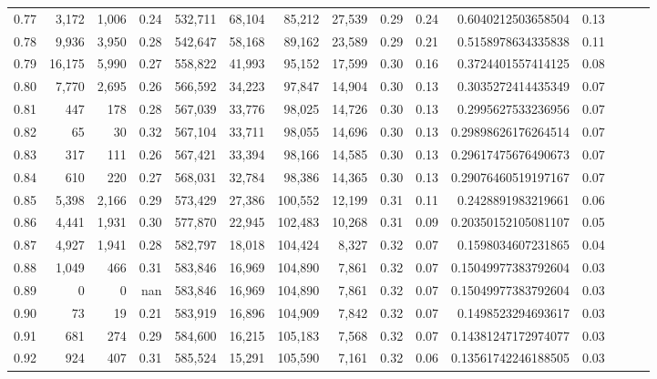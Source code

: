 \begin{tabular}{rrrrrrrrrrrrrrr}
0.77 &   3,172 &  1,006 &  0.24 &  532,711 &   68,104 &   85,212 &   27,539 &  0.29 &  0.24 &   0.6040212503658504 &      0.13 \\
0.78 &   9,936 &  3,950 &  0.28 &  542,647 &   58,168 &   89,162 &   23,589 &  0.29 &  0.21 &   0.5158978634335838 &      0.11 \\
0.79 &  16,175 &  5,990 &  0.27 &  558,822 &   41,993 &   95,152 &   17,599 &  0.30 &  0.16 &   0.3724401557414125 &      0.08 \\
0.80 &   7,770 &  2,695 &  0.26 &  566,592 &   34,223 &   97,847 &   14,904 &  0.30 &  0.13 &   0.3035272414435349 &      0.07 \\
0.81 &     447 &    178 &  0.28 &  567,039 &   33,776 &   98,025 &   14,726 &  0.30 &  0.13 &   0.2995627533236956 &      0.07 \\
0.82 &      65 &     30 &  0.32 &  567,104 &   33,711 &   98,055 &   14,696 &  0.30 &  0.13 &  0.29898626176264514 &      0.07 \\
0.83 &     317 &    111 &  0.26 &  567,421 &   33,394 &   98,166 &   14,585 &  0.30 &  0.13 &  0.29617475676490673 &      0.07 \\
0.84 &     610 &    220 &  0.27 &  568,031 &   32,784 &   98,386 &   14,365 &  0.30 &  0.13 &  0.29076460519197167 &      0.07 \\
0.85 &   5,398 &  2,166 &  0.29 &  573,429 &   27,386 &  100,552 &   12,199 &  0.31 &  0.11 &   0.2428891983219661 &      0.06 \\
0.86 &   4,441 &  1,931 &  0.30 &  577,870 &   22,945 &  102,483 &   10,268 &  0.31 &  0.09 &  0.20350152105081107 &      0.05 \\
0.87 &   4,927 &  1,941 &  0.28 &  582,797 &   18,018 &  104,424 &    8,327 &  0.32 &  0.07 &   0.1598034607231865 &      0.04 \\
0.88 &   1,049 &    466 &  0.31 &  583,846 &   16,969 &  104,890 &    7,861 &  0.32 &  0.07 &  0.15049977383792604 &      0.03 \\
0.89 &       0 &      0 &   nan &  583,846 &   16,969 &  104,890 &    7,861 &  0.32 &  0.07 &  0.15049977383792604 &      0.03 \\
0.90 &      73 &     19 &  0.21 &  583,919 &   16,896 &  104,909 &    7,842 &  0.32 &  0.07 &   0.1498523294693617 &      0.03 \\
0.91 &     681 &    274 &  0.29 &  584,600 &   16,215 &  105,183 &    7,568 &  0.32 &  0.07 &  0.14381247172974077 &      0.03 \\
0.92 &     924 &    407 &  0.31 &  585,524 &   15,291 &  105,590 &    7,161 &  0.32 &  0.06 &  0.13561742246188505 &      0.03 \\

\end{tabular}
